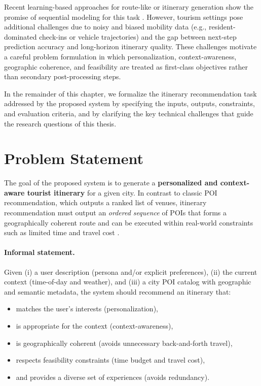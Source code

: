 Recent learning-based approaches for route-like or itinerary generation show the promise of sequential modeling for this task \citep{wu2025tlmr, chang2025itinerary, halder2025deeptourrec}. However, tourism settings pose additional challenges due to noisy and biased mobility data (e.g., resident-dominated check-ins or vehicle trajectories) and the gap between next-step prediction accuracy and long-horizon itinerary quality. These challenges motivate a careful problem formulation in which personalization, context-awareness, geographic coherence, and feasibility are treated as first-class objectives rather than secondary post-processing steps.

In the remainder of this chapter, we formalize the itinerary recommendation task addressed by the proposed system by specifying the inputs, outputs, constraints, and evaluation criteria, and by clarifying the key technical challenges that guide the research questions of this thesis.

\section{Problem Statement}
\label{sec:prob-statement}

The goal of the proposed system is to generate a \textbf{personalized and context-aware tourist itinerary} for a given city. In contrast to classic POI recommendation, which outputs a ranked list of venues, itinerary recommendation must output an \emph{ordered sequence} of POIs that forms a geographically coherent route and can be executed within real-world constraints such as limited time and travel cost \citep{gavalas2014ttdp}.

\paragraph{Informal statement.}
Given (i) a user description (persona and/or explicit preferences), (ii) the current context (time-of-day and weather), and (iii) a city POI catalog with geographic and semantic metadata, the system should recommend an itinerary that:
\begin{itemize}[leftmargin=*]
    \item matches the user's interests (personalization),
    \item is appropriate for the context (context-awareness),
    \item is geographically coherent (avoids unnecessary back-and-forth travel),
    \item respects feasibility constraints (time budget and travel cost),
    \item and provides a diverse set of experiences (avoids redundancy).
\end{itemize}

